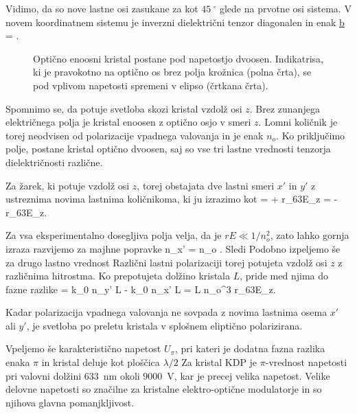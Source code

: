 Vidimo, da so nove lastne osi zasukane za kot $45~^\circ$ glede na prvotne osi sistema.
V novem koordinatnem sistemu je inverzni dielektrični tenzor diagonalen in enak
\beq
\underline{b} = 
.
\eeq
\begin{figure}[h]
\centering
\def\svgwidth{60truemm} 

\caption{Optično enoosni kristal postane pod napetostjo dvoosen. Indikatrisa, ki je pravokotno
na optično os brez polja krožnica (polna črta), se pod vplivom napetosti spremeni v elipso (črtkana črta). }
\label{fig:amn}
\end{figure}

Spomnimo se, da potuje svetloba skozi kristal vzdolž osi $z$. Brez zunanjega električnega
polja je kristal enoosen z optično osjo v smeri $z$. Lomni količnik je torej neodvisen od
polarizacije vpadnega valovanja in je enak $n_o$. Ko priključimo polje, postane kristal
optično dvoosen, saj so vse tri lastne vrednosti tenzorja dielektričnosti različne. 

Za žarek, 
ki potuje vzdolž osi $z$, torej obstajata dve lastni smeri $x'$ in $y'$ z ustreznima
novima lastnima količnikoma, ki ju izrazimo kot
\beq
{} = + r_{63}E_z \quad {} \quad 
{} = - r_{63}E_z. 
\eeq

Za vsa eksperimentalno dosegljiva polja velja, da je $rE\ll1/n_o^2$, 
zato lahko gornja izraza razvijemo za majhne popravke
\beq
n_{x'} =  \approx n_o .
\eeq
Sledi
Podobno izpeljemo še za drugo lastno vrednost
Različni lastni polarizaciji torej potujeta vzdolž osi $z$ z različnima hitrostma. Ko 
prepotujeta dolžino kristala $L$, pride med njima do fazne razlike
\beq
\Delta \phi = k_0 n_{y'} L - k_0 n_{x'} L = L 
n_o^3 r_{63}E_z.
\label{phiAM}
\eeq 

Kadar polarizacija vpadnega valovanja ne sovpada z novima lastnima osema $x'$ ali $y'$, je 
svetloba po preletu kristala v splošnem eliptično polarizirana.

Vpeljemo še karakteristično napetost $U_\pi$, pri kateri je dodatna 
fazna razlika enaka $\pi$ in kristal deluje kot ploščica $\lambda/2$
Za kristal KDP je $\pi$-vrednost napetosti pri valovni dolžini $633$~nm okoli  $9000$~V, kar 
je precej velika napetost. Velike delovne napetosti
so značilne za kristalne elektro-optične modulatorje in so njihova
glavna pomanjkljivost. 

